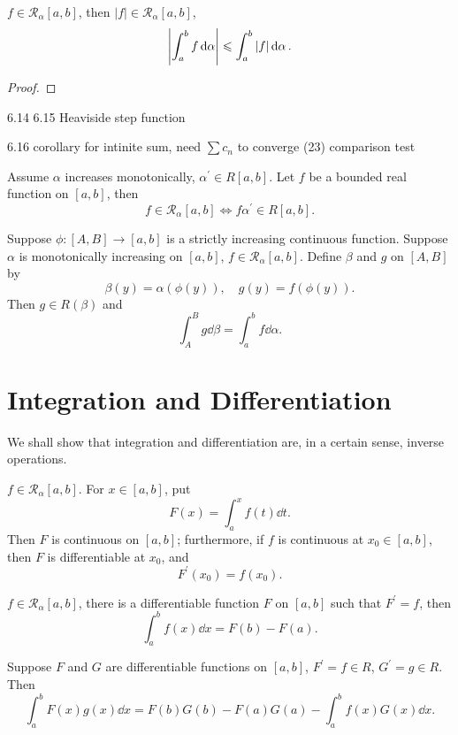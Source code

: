 \begin{theorem}
$f\in \mathcal{R}_\alpha[a,b]$, then $|f|\in \mathcal{R}_\alpha[a,b]$,
\[ \left|\int_a^bf\dd{\alpha}\right|\leqslant\int_a^b|f|\dd{\alpha}. \]
\end{theorem}

\begin{proof}

\end{proof}

6.14 6.15
Heaviside step function

6.16 corollary
for intinite sum, need $\sum c_n$ to converge
(23) comparison test

\begin{proposition}
Assume $\alpha$ increases monotonically, $\alpha^\prime\in R[a,b]$. Let $f$ be a bounded real function on $[a,b]$, then
\[f\in \mathcal{R}_\alpha[a,b]\iff f\alpha^\prime\in R[a,b].\]
\end{proposition}

\begin{proposition}
Suppose $\phi:[A,B]\to[a,b]$ is a strictly increasing continuous function. Suppose $\alpha$ is monotonically increasing on $[a,b]$, $f\in \mathcal{R}_\alpha[a,b]$. Define $\beta$ and $g$ on $[A,B]$ by
\[\beta(y)=\alpha(\phi(y)),\quad g(y)=f(\phi(y)).\]
Then $g\in R(\beta)$ and
\[\int_A^B g\dd{\beta}=\int_a^b f\dd{\alpha}.\]
\end{proposition}

\section{Integration and Differentiation}
We shall show that integration and differentiation are, in a certain sense, inverse operations.

\begin{lemma}
$f\in \mathcal{R}_\alpha[a,b]$. For $x\in [a,b]$, put
\[F(x)=\int_a^x f(t)\dd{t}.\]
Then $F$ is continuous on $[a,b]$; furthermore, if $f$ is continuous at $x_0\in[a,b]$, then $F$ is differentiable at $x_0$, and
\[F^\prime(x_0)=f(x_0).\]
\end{lemma}

\begin{theorem}
$f\in \mathcal{R}_\alpha[a,b]$, there is a differentiable function $F$ on $[a,b]$ such that $F^\prime=f$, then
\begin{equation}
\int_a^b f(x)\dd{x}=F(b)-F(a).
\end{equation}
\end{theorem}

\begin{theorem}
Suppose $F$ and $G$ are differentiable functions on $[a,b]$, $F^\prime=f\in R$, $G^\prime=g\in R$. Then
\begin{equation}
\int_a^b F(x)g(x)\dd{x}=F(b)G(b)-F(a)G(a)-\int_a^b f(x)G(x)\dd{x}.
\end{equation}
\end{theorem}